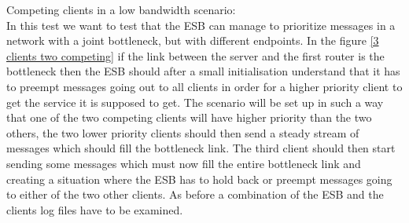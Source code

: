     Competing clients in a low bandwidth scenario:\\
    In this test we want to test that the ESB can manage to prioritize messages in a network with a joint bottleneck, but with different endpoints. In the figure \ref{3 clients two competing} if the link between the server and the first router is the bottleneck then the ESB should after a small initialisation understand that it has to preempt messages going out to all clients in order for a higher priority client to get the service it is supposed to get. The scenario will be set up in such a way that one of the two competing clients will have higher priority than the two others, the two lower priority clients should then send a steady stream of messages which should fill the bottleneck link. The third client should then start sending some messages which must now fill the entire bottleneck link and creating a situation where the ESB has to hold back or preempt messages going to either of the two other clients. As before a combination of the ESB and the clients log files have to be examined.
